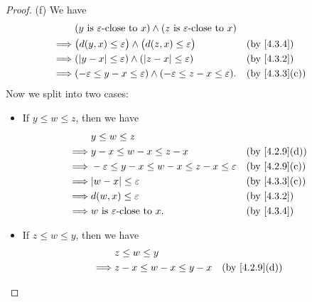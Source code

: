 \begin{proof}{(f)}
  We have
  \begin{align*}
             & (y \text{ is } \varepsilon\text{-close to } x) \land (z \text{ is } \varepsilon\text{-close to } x)                                  \\
    \implies & \big(d(y, x) \leq \varepsilon\big) \land \big(d(z, x) \leq \varepsilon\big)                         &  & \text{(by \cref{4.3.4})}    \\
    \implies & (\abs{y - x} \leq \varepsilon) \land (\abs{z - x} \leq \varepsilon)                                 &  & \text{(by \cref{4.3.2})}    \\
    \implies & (-\varepsilon \leq y - x \leq \varepsilon) \land (-\varepsilon \leq z - x \leq \varepsilon).        &  & \text{(by \cref{4.3.3}(c))}
  \end{align*}
  Now we split into two cases:
  \begin{itemize}
    \item If \(y \leq w \leq z\), then we have
          \begin{align*}
                     & y \leq w \leq z                                                                                 \\
            \implies & y - x \leq w - x \leq z - x                                    &  & \text{(by \cref{4.2.9}(d))} \\
            \implies & -\varepsilon \leq y - x \leq w - x \leq z - x \leq \varepsilon &  & \text{(by \cref{4.2.9}(c))} \\
            \implies & \abs{w - x} \leq \varepsilon                                   &  & \text{(by \cref{4.3.3}(c))} \\
            \implies & d(w, x) \leq \varepsilon                                       &  & \text{(by \cref{4.3.2})}    \\
            \implies & w \text{ is } \varepsilon\text{-close to } x.                  &  & \text{(by \cref{4.3.4})}
          \end{align*}
    \item If \(z \leq w \leq y\), then we have
          \begin{align*}
                     & z \leq w \leq y                                                                                 \\
            \implies & z - x \leq w - x \leq y - x                                    &  & \text{(by \cref{4.2.9}(d))} \\

\end{align*}
\end{itemize}
\end{proof}
